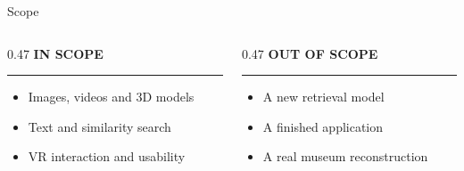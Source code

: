 \begin{frame}[c]{Scope}
\begin{columns}[T,onlytextwidth]
\begin{column}{0.47\textwidth}
\textcolor{unimint!80!black}{\large\bfseries IN SCOPE}
\textcolor{unimint}{\rule{\linewidth}{1.6pt}}
\begin{itemize}
\item Images, videos and 3D models
\item Text and similarity search
\item VR interaction and usability
\end{itemize}
\end{column}
\begin{column}{0.47\textwidth}
\textcolor{unired}{\large\bfseries OUT OF SCOPE}
\textcolor{unimint}{\rule{\linewidth}{1.6pt}}
\begin{itemize}
\item A new retrieval model
\item A finished application
\item A real museum reconstruction
\end{itemize}
\end{column}
\end{columns}
\end{frame}
